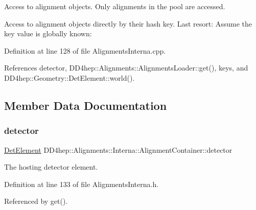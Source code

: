 Access to alignment objects. Only alignments in the pool are accessed. 

Access to alignment objects directly by their hash key. Last resort\+: Assume the key value is globally known\+: 

Definition at line 128 of file Alignments\+Interna.\+cpp.



References detector, D\+D4hep\+::\+Alignments\+::\+Alignments\+Loader\+::get(), keys, and D\+D4hep\+::\+Geometry\+::\+Det\+Element\+::world().



\subsection{Member Data Documentation}
\hypertarget{class_d_d4hep_1_1_alignments_1_1_interna_1_1_alignment_container_a21939f73d4dae58da536ec3f3480e7d3}{}\label{class_d_d4hep_1_1_alignments_1_1_interna_1_1_alignment_container_a21939f73d4dae58da536ec3f3480e7d3} 
\subsubsection{\texorpdfstring{detector}{detector}}
{\footnotesize\ttfamily \hyperlink{class_d_d4hep_1_1_geometry_1_1_det_element}{Det\+Element} D\+D4hep\+::\+Alignments\+::\+Interna\+::\+Alignment\+Container\+::detector}



The hosting detector element. 



Definition at line 133 of file Alignments\+Interna.\+h.



Referenced by get().

\hypertarget{class_d_d4hep_1_1_alignments_1_1_interna_1_1_alignment_container_adb4a3abb58c149338ecc2d08e2c0aec9}{}\label{class_d_d4hep_1_1_alignments_1_1_interna_1_1_alignment_container_adb4a3abb58c149338ecc2d08e2c0aec9} 
